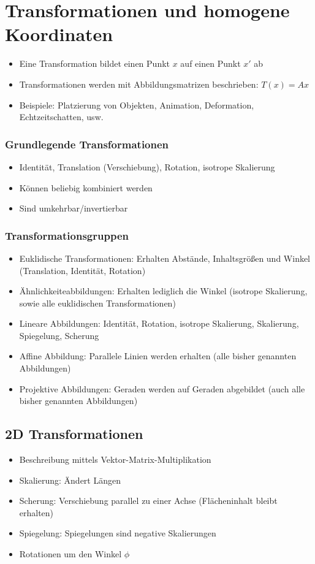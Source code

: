 \section{Transformationen und homogene Koordinaten}
\begin{itemize}
	\item Eine Transformation bildet einen Punkt \(x\) auf einen Punkt \(x'\) ab
	\item Transformationen werden mit Abbildungsmatrizen beschrieben: \(T(x) = Ax\)
	\item Beispiele: Platzierung von Objekten, Animation, Deformation, Echtzeitschatten, usw.
\end{itemize}

\subsubsection{Grundlegende Transformationen}
\begin{itemize}
	\item Identität, Translation (Verschiebung), Rotation, isotrope Skalierung
	\item Können beliebig kombiniert werden
	\item Sind umkehrbar/invertierbar
\end{itemize}

\subsubsection{Transformationsgruppen}
\begin{itemize}
	\item Euklidische Transformationen: Erhalten Abstände, Inhaltsgrößen und Winkel (Translation, Identität, Rotation)
	\item Ähnlichkeiteabbildungen: Erhalten lediglich die Winkel (isotrope Skalierung, sowie alle euklidischen Transformationen)
	\item Lineare Abbildungen: Identität, Rotation, isotrope Skalierung, Skalierung, Spiegelung, Scherung
	\item Affine Abbildung: Parallele Linien werden erhalten (alle bisher genannten Abbildungen)
	\item Projektive Abbildungen: Geraden werden auf Geraden abgebildet (auch alle bisher genannten Abbildungen)
\end{itemize}


\subsection{2D Transformationen}
\begin{itemize}
	\item Beschreibung mittels Vektor-Matrix-Multiplikation
	\item Skalierung: Ändert Längen
	\item Scherung: Verschiebung parallel zu einer Achse (Flächeninhalt bleibt erhalten)
	\item Spiegelung: Spiegelungen sind negative Skalierungen
	\item Rotationen um den Winkel \(\phi\)
\end{itemize}

